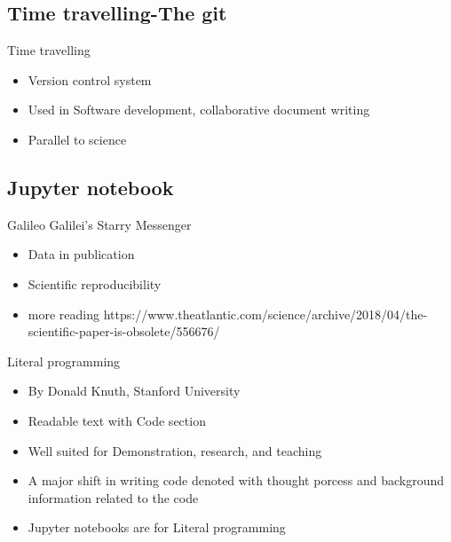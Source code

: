 \subsection[Time travelling-The git]{Time travelling-The git}
\begin{frame}{Time travelling}
	\begin{beamerboxesrounded}{}
		\begin{itemize}
			\item Version control system
			\item Used in Software development, collaborative document writing
			\item Parallel to science 
		\end{itemize}
	\end{beamerboxesrounded}
\end{frame}

\subsection[Jupyter notebook]{Jupyter notebook}

\begin{frame}{Galileo Galilei's  Starry Messenger}
	\begin{beamerboxesrounded}{}
		\begin{itemize}
			\item Data in publication
			\item Scientific reproducibility
			\item more reading https://www.theatlantic.com/science/archive/2018/04/the-scientific-paper-is-obsolete/556676/ 
		\end{itemize}
	\end{beamerboxesrounded}
\end{frame}

\begin{frame}{Literal programming}
	\begin{beamerboxesrounded}{}
		\begin{itemize}
			\item By Donald Knuth, Stanford University
			\item Readable text with Code section
			\item Well suited for Demonstration, research, and teaching 
			\item A major shift in writing code denoted with thought porcess and background information related to the code 
			\item Jupyter notebooks are for Literal programming
		\end{itemize}
	\end{beamerboxesrounded}
\end{frame}


